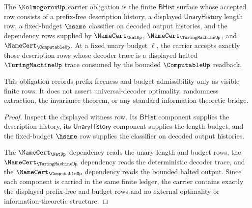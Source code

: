 \begin{theorem}
\label{thm:kolmogorov-prefix-free-carrier-obligation}
The $\KolmogorovUp$ carrier obligation is the finite $\mathsf{BHist}$ surface
whose accepted row consists of a prefix-free description history, a displayed
$\mathsf{UnaryHistory}$ length row, a fixed-budget $\hsame$ classifier on
decoded output histories, and the dependency rows supplied by
$\NameCert_{\NatUp}$, $\NameCert_{\TuringMachineUp}$, and
$\NameCert_{\ComputableUp}$. At a fixed unary budget $\ell$, the carrier accepts
exactly those description rows whose decoder trace is a displayed halted
$\TuringMachineUp$ trace consumed by the bounded $\ComputableUp$ readback.

This obligation records prefix-freeness and budget admissibility only as
visible finite rows. It does not assert universal-decoder optimality,
randomness extraction, the invariance theorem, or any standard
information-theoretic bridge.
\end{theorem}
\begin{proof}
Inspect the displayed witness row. Its $\mathsf{BHist}$ component supplies the
description history, its $\mathsf{UnaryHistory}$ component supplies the length
budget, and the fixed-budget $\hsame$ row supplies the classifier on decoded
output histories.

The $\NameCert_{\NatUp}$ dependency reads the unary length and budget rows, the
$\NameCert_{\TuringMachineUp}$ dependency reads the deterministic decoder
trace, and the $\NameCert_{\ComputableUp}$ dependency reads the bounded halted
output. Since each component is carried in the same finite ledger, the carrier
contains exactly the displayed prefix-free and budget rows and no external
optimality or information-theoretic structure.
\end{proof}

